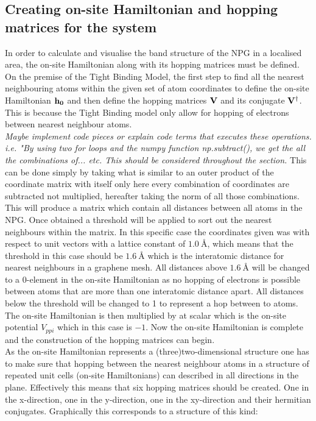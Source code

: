 \subsection{Creating on-site Hamiltonian and hopping matrices for the system}
In order to calculate and visualise the band structure of the NPG in a localised area, the on-site Hamiltonian along with its hopping matrices must be defined. On the premise of the Tight Binding Model, the first step to find all the nearest neighbouring atoms within the given set of atom coordinates to define the on-site Hamiltonian \(\bf{h}_0\) and then define the hopping matrices \(\bf{V}\) and its conjugate \(\bf{V}^{\dagger}\). This is because the Tight Binding model only allow for hopping of electrons between nearest neighbour atoms.\\ \textit{Maybe implement code pieces or explain code terms that executes these operations. i.e. "By using two for loops and the numpy function np.subtract(), we get the all the combinations of... etc. This should be considered throughout the section.} This can be done simply by taking what is similar to an outer product of the coordinate matrix with itself only here every combination of coordinates are subtracted not multiplied, hereafter taking the norm of all those combinations. This will produce a matrix which contain all distances between all atoms in the NPG. Once obtained a threshold will be applied to sort out the nearest neighbours within the matrix. In this specific case the coordinates given was with respect to unit vectors with a lattice constant of \(\SI{1.0}{\angstrom}\), which means that the threshold in this case should be \(\SI{1.6}{\angstrom}\) which is the interatomic distance for nearest neighbours in a graphene mesh. All distances above \(\SI{1.6}{\angstrom}\) will be changed to a 0-element in the on-site Hamiltonian as no hopping of electrons is possible between atoms that are more than one interatomic distance apart. All distances below the threshold will be changed to 1 to represent a hop between to atoms. The on-site Hamiltonian is then multiplied by at scalar which is the on-site potential \(V_{ppi}\) which in this case is \(-1\). Now the on-site Hamiltonian is complete and the construction of the hopping matrices can begin. \\
As the on-site Hamiltonian represents a (three)two-dimensional structure one has to make sure that hopping between the nearest neighbour atoms in a structure of repeated unit cells (on-site Hamiltonians) can described in all directions in the plane. Effectively this means that six hopping matrices should be created. One in the x-direction, one in the y-direction, one in the xy-direction and their hermitian conjugates. Graphically this corresponds to a structure of this kind:
